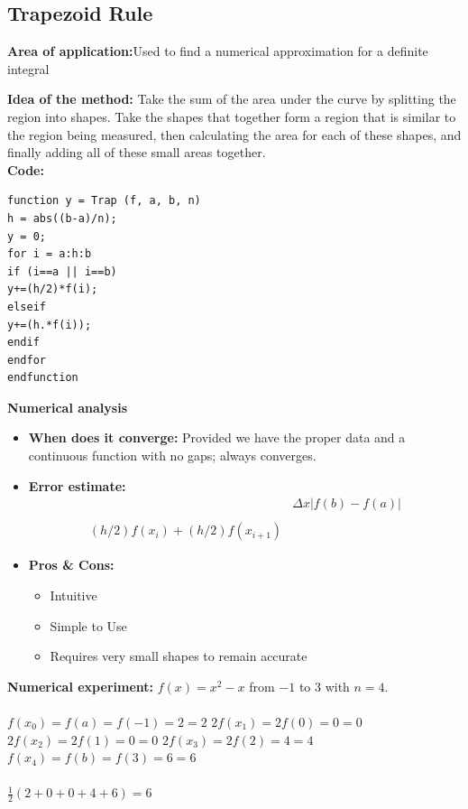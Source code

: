 \documentclass{article}
\begin{document}
	\subsection{Trapezoid Rule}
{\bf Area of application:}Used to find a numerical approximation for a definite integral

{\bf Idea of the method:} 
Take the sum of the area under the curve by splitting the region into shapes. Take the shapes that together form a region that is similar to the region being measured, then calculating the area for each of these shapes, and finally adding all of these small areas together. 
{\\\bf Code:}
\begin{verbatim}
function y = Trap (f, a, b, n)
h = abs((b-a)/n);
y = 0;
for i = a:h:b
if (i==a || i==b)
y+=(h/2)*f(i);
elseif
y+=(h.*f(i));
endif
endfor
endfunction
\end{verbatim}
{\bf Numerical analysis}
\begin{itemize}
	\item{\bf When does it converge:} Provided we have the proper data and a continuous function with no gaps; always converges.
	\item {\bf Error estimate:}
	\begin{equation}
	\begin{split}
	&\Delta x | f ( b ) - f ( a ) |\\
	\\
	(h/2)f(x_i)+(h/2)f(x_{i+1})
	\end{split}
	\end{equation}
	\item {\bf Pros \& Cons:}
	\begin{itemize}
		\item Intuitive
		\item Simple to Use
		\item Requires very small shapes to remain accurate
	\end{itemize}
\end{itemize}
{\bf Numerical experiment:}
$ f(x)=x^2-x $ from $ -1$ to 3 with $ n=4 $.\\
\\
$f \left( x _ { 0 } \right) = f ( a ) = f ( - 1 ) = 2 = 2$
$2 f \left( x _ { 1 } \right) = 2 f ( 0 ) = 0 = 0$
$2 f \left( x _ { 2 } \right) = 2 f ( 1 ) = 0 = 0$
$2 f \left( x _ { 3 } \right) = 2 f ( 2 ) = 4 = 4$
$f \left( x _ { 4 } \right) = f ( b ) = f ( 3 ) = 6 = 6$\\
\\
$\frac { 1 } { 2 } ( 2 + 0 + 0 + 4 + 6 ) = 6$
\end{document}
